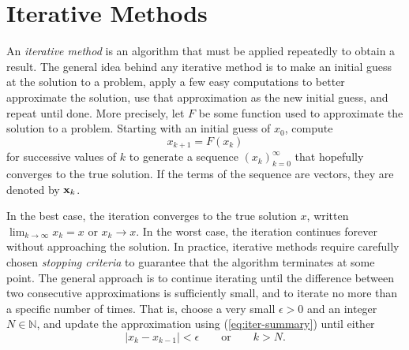 \labdependencies{}

\section*{Iterative Methods} %

An \emph{iterative method} is an algorithm that must be applied repeatedly to obtain a result.
The general idea behind any iterative method is to make an initial guess at the solution to a problem, apply a few easy computations to better approximate the solution, use that approximation as the new initial guess, and repeat until done.
More precisely, let $F$ be some function used to approximate the solution to a problem.
Starting with an initial guess of $x_0$, compute
\begin{equation}x_{k+1} = F(x_k)\label{eq:iter-summary}\end{equation}
for successive values of $k$ to generate a sequence $(x_k)_{k=0}^\infty$ that hopefully converges to the true solution.
If the terms of the sequence are vectors, they are denoted by $\mathbf{x}_k$.

In the best case, the iteration converges to the true solution $x$, written $\lim_{k\rightarrow\infty} x_k = x$ or $x_k\rightarrow x$.
In the worst case, the iteration continues forever without approaching the solution.
In practice, iterative methods require carefully chosen \emph{stopping criteria} to guarantee that the algorithm terminates at some point.
The general approach is to continue iterating until the difference between two consecutive approximations is sufficiently small, and to iterate no more than a specific number of times.
That is, choose a very small $\epsilon > 0$ and an integer $N\in\mathbb{N}$, and update the approximation using (\ref{eq:iter-summary}) until either
\begin{equation} %
    |x_k - x_{k-1}| < \epsilon
    \qquad \text{or} \qquad
    k > N.
\end{equation}

